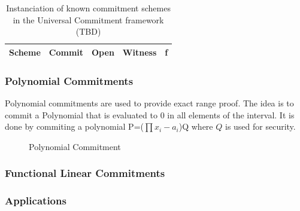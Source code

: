 \documentclass[11pt]{llncs2e/llncs}
\begin{document}
\begin{table}
\begin{center}
 \begin{tabular}{ |c| c|c|c|c|}
  \hline
  Scheme & Commit & Open & Witness & f \\
  \hline
 \end{tabular}
 \end{center}
 \caption{Instanciation of known commitment schemes in the Universal Commitment framework (TBD)}
\end{table}

\subsubsection{Polynomial Commitments}
 
 Polynomial commitments are used to provide exact range proof. The idea is to commit a Polynomial that is evaluated to $0$ in all elements of the interval. It is done by commiting a polynomial P=($\prod x_i-a_i$)Q where $Q$ is used for security.
  
 \begin{figure}[h!] 
 
\caption{Polynomial Commitment \cite{Kate10}}
 \end{figure}
 
\subsubsection{Functional Linear Commitments}

 \subsubsection{Applications}
 
\end{document}
